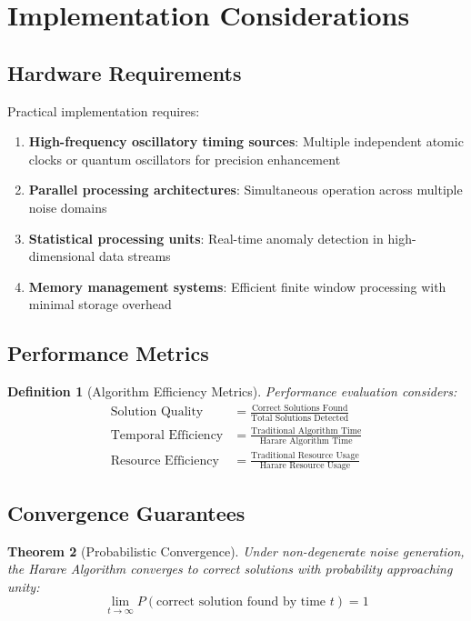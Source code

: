\documentclass[11pt,a4paper]{article}
\newtheorem{theorem}{Theorem}[section]
\newtheorem{definition}[theorem]{Definition}
\theoremstyle{remark}
\begin{document}
\section{Implementation Considerations}

\subsection{Hardware Requirements}

Practical implementation requires:

\begin{enumerate}
\item \textbf{High-frequency oscillatory timing sources}: Multiple independent atomic clocks or quantum oscillators for precision enhancement
\item \textbf{Parallel processing architectures}: Simultaneous operation across multiple noise domains
\item \textbf{Statistical processing units}: Real-time anomaly detection in high-dimensional data streams
\item \textbf{Memory management systems}: Efficient finite window processing with minimal storage overhead
\end{enumerate}

\subsection{Performance Metrics}

\begin{definition}[Algorithm Efficiency Metrics]
Performance evaluation considers:
\begin{align}
\text{Solution Quality} &= \frac{\text{Correct Solutions Found}}{\text{Total Solutions Detected}} \\
\text{Temporal Efficiency} &= \frac{\text{Traditional Algorithm Time}}{\text{Harare Algorithm Time}} \\
\text{Resource Efficiency} &= \frac{\text{Traditional Resource Usage}}{\text{Harare Resource Usage}}
\end{align}
\end{definition}

\subsection{Convergence Guarantees}

\begin{theorem}[Probabilistic Convergence]
Under non-degenerate noise generation, the Harare Algorithm converges to correct solutions with probability approaching unity:
$$\lim_{t \to \infty} P(\text{correct solution found by time } t) = 1$$
\end{theorem}
\end{document}
